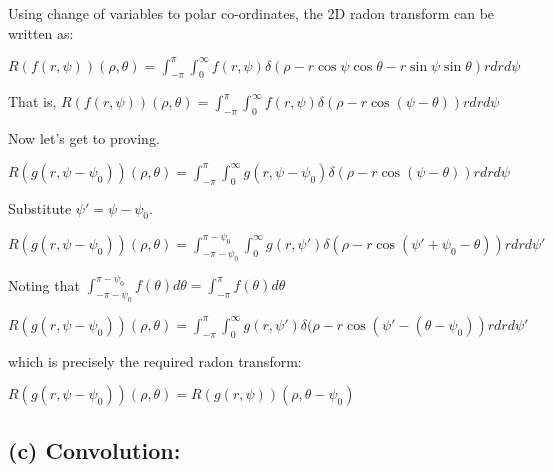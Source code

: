 \documentclass[fleqn, 11pt]{article}
\begin{document}
Using change of variables to polar co-ordinates, the 2D radon transform can be written as: 

\smallskip

$R (f(r, \psi)) (\rho, \theta) 
= \displaystyle \int_{-\pi}^{\pi} \int_{0}^{\infty}  f(r, \psi) \delta (\rho - r \cos \psi \cos \theta - r \sin \psi \sin \theta) r dr d \psi 
$

\medskip

That is, 
$ R (f(r, \psi)) (\rho, \theta) 
= \displaystyle \int_{-\pi }^{\pi} \int_{0}^{\infty}  f(r, \psi) \delta (\rho - r \cos (\psi - \theta) ) r dr d \psi 
$

\medskip

Now let's get to proving. 

\smallskip

$ R (g(r, \psi - \psi_0)) (\rho, \theta)  
= \displaystyle \int_{-\pi }^{\pi} \int_{0}^{\infty}  g(r, \psi - \psi_0) \delta (\rho - r \cos (\psi - \theta) ) r dr d \psi 
$

\medskip

Substitute $\psi' = \psi - \psi_0$. 

\smallskip

$ R (g(r, \psi - \psi_0)) (\rho, \theta)  
= \displaystyle \int_{-\pi - \psi_0 }^{\pi - \psi_0 } \int_{0}^{\infty}  g(r, \psi') \delta (\rho - r \cos (\psi' + \psi_0 - \theta) ) r dr d \psi' 
$

\medskip

Noting that 
$ \displaystyle \int_{-\pi - \psi_0 }^{\pi - \psi_0 } f(\theta) d \theta =  
\displaystyle \int_{-\pi  }^{\pi } f(\theta) d \theta 
$

\medskip

$ R (g(r, \psi - \psi_0)) (\rho, \theta)  
= \displaystyle \int_{-\pi}^{\pi} \int_{0}^{\infty}  g(r, \psi') \delta (\rho - r \cos (\psi' - ( \theta- \psi_0)) r dr d \psi' 
$

\medskip

which is precisely the required radon transform:

\medskip

$ R (g(r, \psi - \psi_0)) (\rho, \theta)  
= R (g(r, \psi)) (\rho, \theta - \psi_0 )
$




\newpage 

\subsection*{(c) Convolution:}
\end{document}
